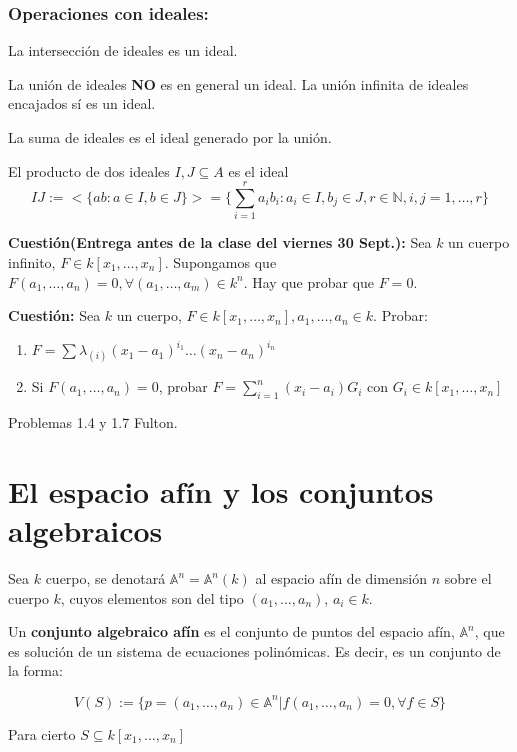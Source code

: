 \subsubsection{Operaciones con ideales:}

\begin{itemize*}
\item La intersección de ideales es un ideal.
\item La unión de ideales \textbf{NO} es en general un ideal. La unión infinita de ideales encajados sí es un ideal.
\item La suma de ideales es el ideal generado por la unión.
\item El producto de dos ideales $I,J\subseteq A$ es el ideal $$IJ := <\{ab : a\in I, b \in J \} > = \{\sum_{i=1}^{r}a_i b_i : a_i \in I, b_j \in J, r \in \mathbb{N}, i,j=1, \dots, r  \}$$
\end{itemize*}

\textbf{Cuestión(Entrega antes de la clase del viernes 30 Sept.):} Sea $k$ un cuerpo infinito, $F\in k[x_1, \dots , x_n]$. Supongamos que $F(a_1, \dots , a_n ) = 0, \forall (a_1, \dots , a_m) \in k^n$. Hay que probar que $F=0$.


\textbf{Cuestión:}  Sea $k$ un cuerpo, $F\in k[x_1, \dots , x_n], a_1, \dots , a_n \in k$. Probar:

\begin{enumerate}
\item $F=\sum \lambda_{(i)}(x_1-a_1)^{i_1}\dots(x_n-a_n)^{i_n}$ 
\item Si $F(a_1,\dots,a_n) = 0$, probar $F=\sum_{i=1}^n(x_i-a_i)G_i$ con $G_i \in k[x_1,\dots ,x_n]$
\end{enumerate}


Problemas 1.4 y 1.7 Fulton.

\section{El espacio afín y los conjuntos algebraicos}

Sea $k$ cuerpo, se denotará $\mathbb{A}^n=\mathbb{A}^n(k)$ al espacio afín de dimensión $n$ sobre el cuerpo $k$, cuyos elementos son del tipo $(a_1,\dots,a_n)$, $a_i\in k$.


\begin{Def}
Un \textbf{conjunto algebraico afín} es el conjunto de puntos del espacio afín, $\mathbb{A}^n$, que es solución de un sistema de ecuaciones polinómicas. Es decir, es un conjunto de la forma:

$$ V(S):= \{ p=(a_1,\dots , a_n) \in \mathbb{A}^n | f(a_1,\dots , a_n) = 0, \forall f\in S \} $$

Para cierto $S\subseteq k[x_1,\dots, x_n]$
\end{Def}

